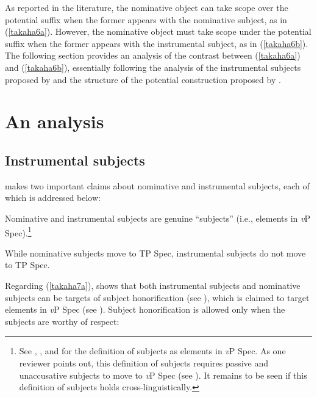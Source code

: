\documentclass[output=paper]{langscibook}
\begin{document}
As reported in the literature, the nominative object can take scope over the potential suffix when the former appears with the nominative subject, as in (\ref{takaha6a}). However, the nominative object must take scope under the potential suffix when the former appears with the instrumental subject, as in (\ref{takaha6b}). The following section provides an analysis of the contrast between (\ref{takaha6a}) and (\ref{takaha6b}), essentially following the analysis of the instrumental subjects proposed by \citet{Kishimoto2010} and the structure of the potential construction proposed by \citet{shimamurawurmbrand2014}.

\section{An analysis}\label{takahas3}

\subsection{Instrumental subjects}
\citet{Kishimoto2010} makes two important claims about nominative and instrumental subjects, each of which is addressed below:

\begin{exe}
\ex 
\begin{xlist}
\ex \label{takaha7a}
Nominative and instrumental subjects are genuine “subjects” (i.e., elements in \emph{v}P Spec).\footnote{See \citet{Saito2006a}, \citet{Takano2011}, and \citet{Kishimoto2012} for the definition of subjects as elements in \emph{v}P Spec. As one reviewer points out, this definition of subjects requires passive and unaccusative subjects to move to \emph{v}P Spec (see \citealt{Saito2006a, Takano2011, Kishimoto2012}). It remains to be seen if this definition of subjects holds cross-linguistically.} 

\ex \label{takaha7b}
While nominative subjects move to TP Spec, instrumental subjects do not move to TP Spec.

\end{xlist}
\end{exe}

Regarding (\ref{takaha7a}), \citet{Kishimoto2010} shows that both instrumental subjects and nominative subjects can be targets of subject honorification (see \citealt{Harada1976, Shibatani1978}), which is claimed to target elements in \emph{v}P Spec (see \citealt{Takano2011, Kishimoto2012}). Subject honorification is allowed only when the subjects are worthy of respect:
\end{document}
